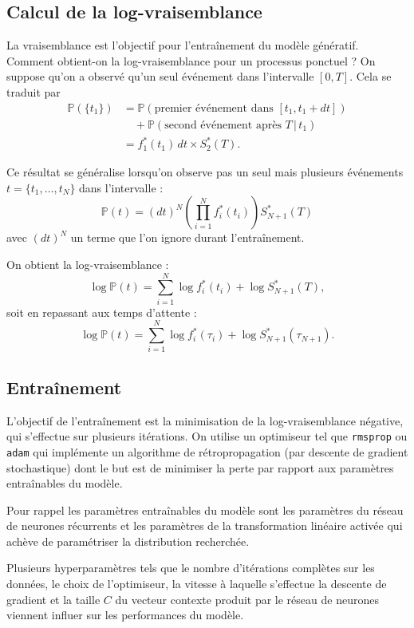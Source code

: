 \documentclass{article}
\theoremstyle{definition}
\theoremstyle{remark}
\begin{document}
\subsection{Calcul de la log-vraisemblance}

La vraisemblance est l'objectif pour l'entraînement du modèle génératif.
\cite{dascher2021flexible}
Comment obtient-on la log-vraisemblance pour un processus ponctuel ?
On suppose qu'on a observé qu'un seul événement dans l'intervalle $[0, T]$.
Cela se traduit par
\begin{align*}
\mathbb{P}(\{t_1\})
& = \mathbb{P}(\text{premier événement dans } [t_1, t_1+dt]) \\
& \quad + \mathbb{P}(\text{second événement après } T \, |\,  t_1) \\
& = f^*_1(t_1)\, dt \times S^*_2(T).
\end{align*}

Ce résultat se généralise lorsqu'on observe pas un seul mais plusieurs
événements $t = \{t_1, \dots, t_N\}$ dans l'intervalle :
$$\mathbb{P}(t) = (dt)^N \left(\prod_{i=1}^N f^*_i(t_i)\right)
S^*_{N+1}(T)$$ avec $(dt)^N$ un terme que l'on ignore durant l'entraînement.

On obtient la log-vraisemblance :
$$\log \mathbb{P}(t) = \sum_{i=1}^N \log f^*_i(t_i) + \log S^*_{N+1}(T),$$
soit en repassant aux temps d'attente :
$$\log \mathbb{P}(t) = \sum_{i=1}^N \log f^*_i(\tau_i)
+ \log S^*_{N+1}(\tau_{N+1}).$$

\subsection{Entraînement}

L'objectif de l'entraînement est la minimisation de 
la log-vraisemblance négative, qui s'effectue sur plusieurs itérations.
On utilise un optimiseur tel que \verb|rmsprop| ou \verb|adam| qui implémente
un algorithme de rétropropagation (par descente de gradient stochastique)
dont le but est de minimiser la perte par rapport aux paramètres entraînables
du modèle.

Pour rappel les paramètres entraînables du modèle sont les paramètres
du réseau de neurones récurrents et les paramètres de la transformation
linéaire activée qui achève de paramétriser la distribution recherchée.

Plusieurs hyperparamètres tels que le nombre d'itérations complètes sur les
données, le choix de l'optimiseur, la vitesse à laquelle s'effectue la
descente de gradient et la taille $C$ du vecteur contexte produit par le
réseau de neurones viennent influer sur les performances du modèle.

\printbibliography
\end{document}
